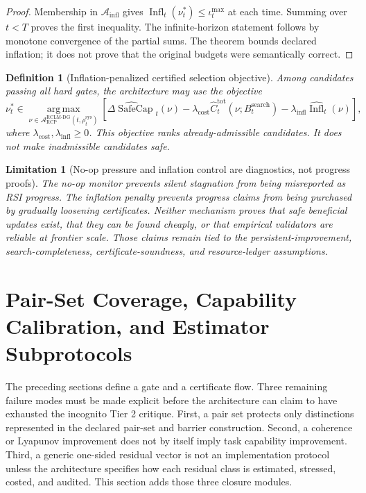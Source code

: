 \documentclass[11pt,a4paper]{article}
\newtheorem{definition}[theorem]{Definition}
\newtheorem{limitation}[theorem]{Limitation}
\newcommand{\Acal}{\mathcal A}
\newcommand{\argmax}{\operatorname*{arg\,max}}
\newcommand{\RCP}{\mathrm{RCP}}
\newcommand{\RCLM}{\mathrm{RCLM}}
\newcommand{\DG}{\mathrm{DG}}
\newcommand{\sys}{\mathrm{sys}}
\newcommand{\SafeCap}{\operatorname{SafeCap}}
\newcommand{\search}{\mathrm{search}}
\newcommand{\cost}{\mathrm{cost}}
\newcommand{\infl}{\mathrm{infl}}
\newcommand{\tot}{\mathrm{tot}}
\begin{document}
\begin{proof}
Membership in \(\Acal_{\infl}\) gives \(\operatorname{Infl}_t(\nu_t^*)\le\iota_t^{\max}\) at each time. Summing over \(t<T\) proves the first inequality. The infinite-horizon statement follows by monotone convergence of the partial sums. The theorem bounds declared inflation; it does not prove that the original budgets were semantically correct.
\end{proof}

\begin{definition}[Inflation-penalized certified selection objective]
\label{def:inflation-penalized-objective}
Among candidates passing all hard gates, the architecture may use the objective
\[
\nu_t^*
\in
\argmax_{\nu\in\Acal_{\RCP}^{\RCLM\text{-}\DG}(t,\rho_t^{\sys})}
\left[
\widehat{\Delta\SafeCap}_t(\nu)
-\lambda_{\cost}\widehat C_t^{\tot}(\nu;B_t^{\search})
-\lambda_{\infl}\widehat{\operatorname{Infl}}_t(\nu)
\right],
\]
where \(\lambda_{\cost},\lambda_{\infl}\ge0\). This objective ranks already-admissible candidates. It does not make inadmissible candidates safe.
\end{definition}

\begin{limitation}[No-op pressure and inflation control are diagnostics, not progress proofs]
The no-op monitor prevents silent stagnation from being misreported as RSI progress. The inflation penalty prevents progress claims from being purchased by gradually loosening certificates. Neither mechanism proves that safe beneficial updates exist, that they can be found cheaply, or that empirical validators are reliable at frontier scale. Those claims remain tied to the persistent-improvement, search-completeness, certificate-soundness, and resource-ledger assumptions.
\end{limitation}



\section{Pair-Set Coverage, Capability Calibration, and Estimator Subprotocols}
\label{sec:tier2-completion}

The preceding sections define a gate and a certificate flow. Three remaining failure modes must be made explicit before the architecture can claim to have exhausted the incognito Tier 2 critique. First, a pair set protects only distinctions represented in the declared pair-set and barrier construction. Second, a coherence or Lyapunov improvement does not by itself imply task capability improvement. Third, a generic one-sided residual vector is not an implementation protocol unless the architecture specifies how each residual class is estimated, stressed, costed, and audited. This section adds those three closure modules.
\end{document}
